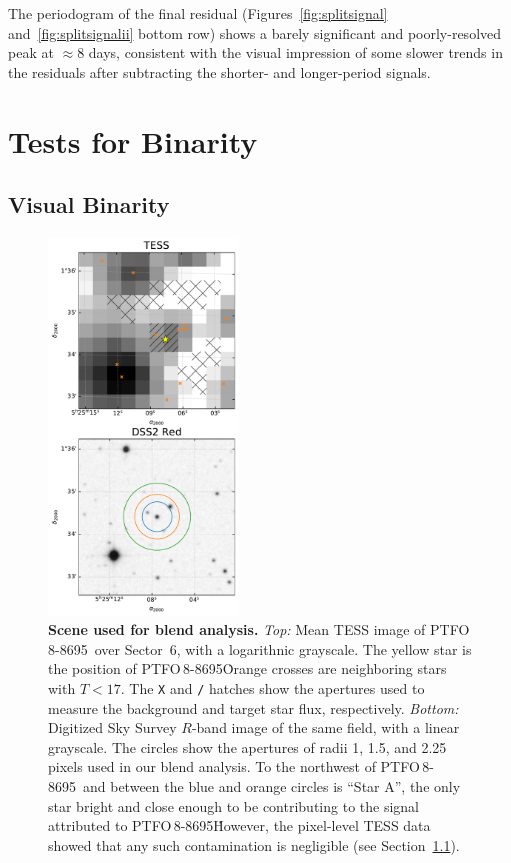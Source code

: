 \documentclass[12pt,twocolumn,tighten]{aastex62}
\newcommand{\ptfo}{PTFO$\,$8-8695}
\begin{document}
The periodogram of the final residual (Figures~\ref{fig:splitsignal} and~\ref{fig:splitsignalii}
bottom row) shows a barely significant and poorly-resolved peak at
$\approx$8 days, consistent with the visual impression of some slower
trends in the residuals after subtracting the shorter- and longer-period
signals.

\section{Tests for Binarity}
\label{sec:gaia}

\subsection{Visual Binarity}
\label{subsec:blend}

\begin{figure}[t]
	\begin{center}
		\leavevmode
		\includegraphics[width=0.45\textwidth]{f4.pdf}
	\end{center}
	\vspace{-0.7cm}
	\caption{ {\bf Scene used for blend analysis.}
		{\it Top:} Mean TESS image of \ptfo\ over Sector~6, with a
		logarithnic grayscale. The yellow star is the position of \ptfo\.
		Orange crosses are neighboring stars with $T<17$. The
		\texttt{X} and \texttt{/} hatches show the apertures
		used to measure the background and target star flux, respectively.
		{\it Bottom:} Digitized Sky Survey $R$-band image of the same
		field, with a linear grayscale. The circles show the apertures of radii
		1, 1.5, and 2.25 pixels used in our blend analysis. To the northwest
		of \ptfo\ and between the
		blue and orange circles is ``Star A'',
		the only star bright and close enough to be contributing
		to the signal attributed to \ptfo\. However, the pixel-level TESS data
		showed that any such contamination is negligible (see
		Section~\ref{subsec:blend}).
		\label{fig:scene}
	}
\end{figure}
\end{document}
